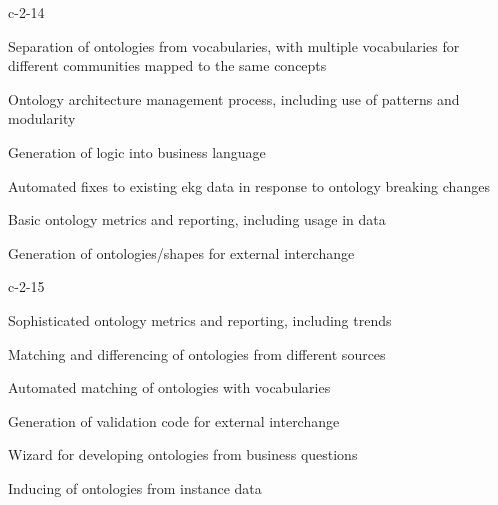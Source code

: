 \begin{level-assessment}{c-2-1}{4}

    \item Separation of ontologies from vocabularies, with multiple vocabularies for different communities
          mapped to the same concepts
    \item Ontology architecture management process, including use of patterns and modularity
    \item Generation of logic into business language
    \item Automated fixes to existing \gls{ekg} data in response to ontology breaking changes
    \item Basic ontology metrics and reporting, including usage in data
    \item Generation of ontologies/shapes for external interchange

\end{level-assessment}

\begin{level-assessment}{c-2-1}{5}

    \item Sophisticated ontology metrics and reporting, including trends
    \item Matching and differencing of ontologies from different sources
    \item Automated matching of ontologies with vocabularies
    \item Generation of validation code for external interchange
    \item Wizard for developing ontologies from business questions
    \item Inducing of ontologies from instance data

\end{level-assessment}
